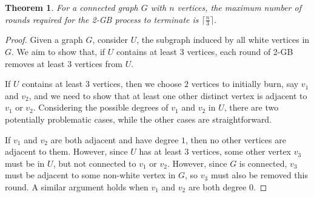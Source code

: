 \documentclass{mpaper}
\newtheorem{theorem}{Theorem}[section]
\begin{document}
\begin{theorem}
  \label{thm/connected-bound}
  For a connected graph $G$ with $n$ vertices, the maximum number of rounds required for the 2-GB process to terminate is $\lceil \frac{n}{3} \rceil$.
\end{theorem}

\begin{proof}
  Given a graph $G$, consider $U$, the subgraph induced by all white vertices in $G$. We aim to show that, if $U$ contains at least $3$ vertices, each round of 2-GB removes at least $3$ vertices from $U$.

  If $U$ contains at least $3$ vertices, then we choose $2$ vertices to initially burn, say $v_1$ and $v_2$, and we need to show that at least one other distinct vertex is adjacent to $v_1$ or $v_2$. Considering the possible degrees of $v_1$ and $v_2$ in $U$, there are two potentially problematic cases, while the other cases are straightforward.

  If $v_1$ and $v_2$ are both adjacent and have degree $1$, then no other vertices are adjacent to them. However, since $U$ has at least $3$ vertices, some other vertex $v_3$ must be in $U$, but not connected to $v_1$ or $v_2$. However, since $G$ is connected, $v_3$ must be adjacent to some non-white vertex in $G$, so $v_3$ must also be removed this round. A similar argument holds when $v_1$ and $v_2$ are both degree $0$.
  
  




\end{proof}
\end{document}
